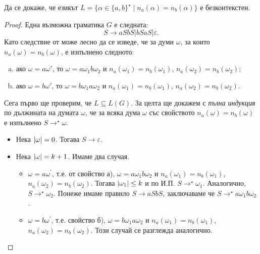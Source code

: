 \begin{problem}
  Да се докаже, че езикът $L = \{\alpha \in \{a,b\}^\star\mid n_a(\alpha) = n_b(\alpha)\}$ 
  е безконтекстен.
\end{problem}
\begin{proof}
  Една възможна граматика $G$ е следната: 
  \[S \rightarrow aSbS\vert bSaS \vert\varepsilon.\]
  Като следствие от  може лесно да се изведе, че за думи $\omega$, за които $n_a(\omega) = n_b(\omega)$,
  е изпълнено следното:
  \begin{enumerate}[a)]
  \item 
    ако $\omega = a\omega'$, то
    $\omega = a\omega_1b\omega_2$ и $n_a(\omega_1) = n_b(\omega_1)$, $n_a(\omega_2) = n_b(\omega_2)$;
  \item
    ако $\omega = b\omega'$, то
    $\omega = b\omega_1a\omega_2$ и $n_a(\omega_1) = n_b(\omega_1)$, $n_a(\omega_2) = n_b(\omega_2)$.
  \end{enumerate}

  Сега първо ще проверим, че $L \subseteq L(G)$.
  За целта ще докажем с {\em пълна индукция} по дължината на думата $\omega$, че за всяка дума $\omega$ със свойството $n_a(\omega) = n_b(\omega)$ е изпълнено
  $S \rightarrow^\star \omega$.
  \begin{itemize}
  \item 
    Нека $\lvert{\omega}\rvert = 0$. Тогава $S \rightarrow \varepsilon$.
  \item
    Нека $\lvert{\omega}\rvert = k+1$. Имаме два случая.
    \begin{itemize}
    \item 
      $\omega = a\omega^\prime$, т.е. от свойство а), $\omega = a\omega_1b\omega_2$ и $n_a(\omega_1) = n_b(\omega_1)$, $n_a(\omega_2) = n_b(\omega_2)$.
      Тогава $\lvert{\omega_1}\rvert \leq k$ и по И.П. $S \rightarrow^\star \omega_1$.
      Аналогично, $S \rightarrow^\star \omega_2$.
      Понеже имаме правило $S \rightarrow aSbS$, заключаваме че $S \rightarrow^\star a\omega_1b\omega_2$.
    \item
      $\omega = b\omega^\prime$, т.е. свойство б), $\omega = b\omega_1a\omega_2$ и $n_a(\omega_1) = n_b(\omega_1)$, $n_a(\omega_2) = n_b(\omega_2)$.
      Този случай се разглежда аналогично.
    \end{itemize}
  \end{itemize}
  

\end{proof}
